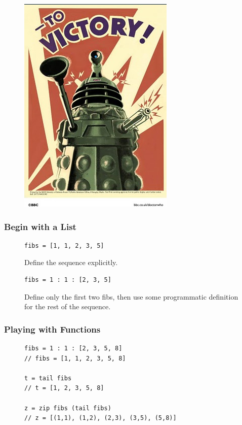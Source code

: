 \documentclass{beamer}
\begin{document}
    \begin{frame}[fragile=singleslide]
        \begin{figure}
            \centering
            \includegraphics[scale=0.35]{./images/dalek-to-victory.jpg}
        \end{figure}
    \end{frame}

    \begin{frame}[fragile=singleslide]
        \frametitle{Begin with a List}

        \begin{figure}
            \begin{lstlisting}
fibs = [1, 1, 2, 3, 5]
            \end{lstlisting}
            \caption{Define the sequence explicitly.}
        \end{figure}
        \begin{figure}
            \begin{lstlisting}
fibs = 1 : 1 : [2, 3, 5]
            \end{lstlisting}
            \caption{Define only the first two fibs, then use some programmatic definition for the rest of the sequence.}
        \end{figure}
    \end{frame}

    \begin{frame}[fragile=singleslide]
        \frametitle{Playing with Functions}

        \begin{figure}
            \begin{lstlisting}
fibs = 1 : 1 : [2, 3, 5, 8]
// fibs = [1, 1, 2, 3, 5, 8]

t = tail fibs
// t = [1, 2, 3, 5, 8]

z = zip fibs (tail fibs)
// z = [(1,1), (1,2), (2,3), (3,5), (5,8)]
            \end{lstlisting}
        \end{figure}
    \end{frame}
\end{document}
